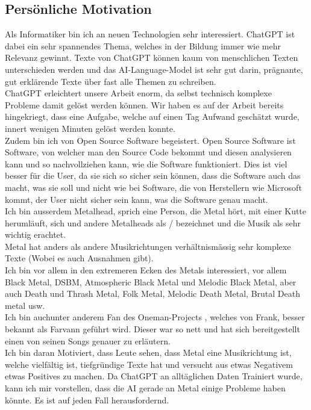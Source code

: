 \documentclass[twocolumn,10pt]{article}
\begin{document}
		\subsection{Persönliche Motivation}
		Als Informatiker bin ich an neuen Technologien sehr interessiert. ChatGPT ist dabei ein sehr spannendes Thema, welches in der Bildung immer wie mehr Relevanz gewinnt. Texte von ChatGPT können kaum von menschlichen Texten unterschieden werden und das AI-Language-Model ist sehr gut darin, prägnante, gut erklärende Texte über fast alle Themen zu schreiben.\\
		ChatGPT erleichtert unsere Arbeit enorm, da selbst technisch komplexe Probleme damit gelöst werden können. Wir haben es auf der Arbeit bereits hingekriegt, dass eine Aufgabe, welche auf einen Tag Aufwand geschätzt wurde, innert wenigen Minuten gelöst werden konnte.\\
		Zudem bin ich von Open Source Software begeistert. Open Source Software ist Software, von welcher man den Source Code bekommt und diesen analysieren kann und so nachvollziehen kann, wie die Software funktioniert. Dies ist viel besser für die User, da sie sich so sicher sein können, dass die Software auch das macht, was sie soll und nicht wie bei Software, die von Herstellern wie Microsoft kommt, der User nicht sicher sein kann, was die Software genau macht.\\
		Ich bin ausserdem Metalhead, sprich eine Person, die Metal hört, mit einer Kutte herumläuft, sich und andere Metalheads als  /  bezeichnet und die Musik als sehr wichtig erachtet.\\ 
		Metal hat anders als andere Musikrichtungen verhältnismässig sehr komplexe Texte (Wobei es auch Ausnahmen gibt).\\
		Ich bin vor allem in den extremeren Ecken des Metals interessiert, vor allem Black Metal, DSBM, Atmospheric Black Metal und Melodic Black Metal, aber auch Death und Thrash Metal, Folk Metal, Melodic Death Metal, Brutal Death metal usw.\\
		Ich bin auchunter anderem Fan des Oneman-Projects , welches von Frank, besser bekannt als Farvann geführt wird. Dieser war so nett und hat sich bereitgestellt einen von seinen Songs genauer zu erläutern.\\
		Ich bin daran Motiviert, dass Leute sehen, dass Metal eine Musikrichtung ist, welche vielfältig ist, tiefgründige Texte hat und versucht aus etwas Negativem etwas Positives zu machen. Da ChatGPT an alltäglichen Daten Trainiert wurde, kann ich mir vorstellen, dass die AI gerade an Metal einige Probleme haben könnte. Es ist auf jeden Fall herausfordernd.
	\clearpage
\end{document}
